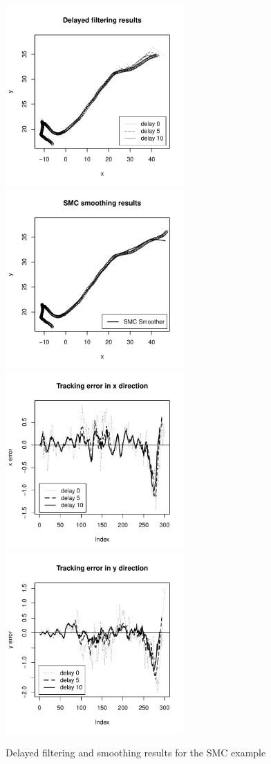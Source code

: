 \begin{figure}
\centering
\includegraphics[width=2.7in]{SMC2.pdf}
\includegraphics[width=2.7in]{SMC5.pdf}
\includegraphics[width=2.7in]{SMC3.pdf}
\includegraphics[width=2.7in]{SMC4.pdf}
\caption{Delayed filtering and smoothing results for the SMC example}
\end{figure}


